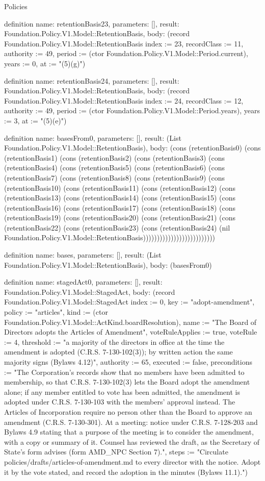 \begin{lexlean}{Policies}
\begin{semanticmodule}
definition{
  name: retentionBasis23,
  parameters: [],
  result: Foundation.Policy.V1.Model::RetentionBasis,
  body: (record Foundation.Policy.V1.Model::RetentionBasis {index := 23, recordClass := 11, authority := 49, period := (ctor Foundation.Policy.V1.Model::Period.current), years := 0, at := "(5)(g)"})
}

definition{
  name: retentionBasis24,
  parameters: [],
  result: Foundation.Policy.V1.Model::RetentionBasis,
  body: (record Foundation.Policy.V1.Model::RetentionBasis {index := 24, recordClass := 12, authority := 49, period := (ctor Foundation.Policy.V1.Model::Period.years), years := 3, at := "(5)(e)"})
}

definition{
  name: basesFrom0,
  parameters: [],
  result: (List Foundation.Policy.V1.Model::RetentionBasis),
  body: (cons (retentionBasis0) (cons (retentionBasis1) (cons (retentionBasis2) (cons (retentionBasis3) (cons (retentionBasis4) (cons (retentionBasis5) (cons (retentionBasis6) (cons (retentionBasis7) (cons (retentionBasis8) (cons (retentionBasis9) (cons (retentionBasis10) (cons (retentionBasis11) (cons (retentionBasis12) (cons (retentionBasis13) (cons (retentionBasis14) (cons (retentionBasis15) (cons (retentionBasis16) (cons (retentionBasis17) (cons (retentionBasis18) (cons (retentionBasis19) (cons (retentionBasis20) (cons (retentionBasis21) (cons (retentionBasis22) (cons (retentionBasis23) (cons (retentionBasis24) (nil Foundation.Policy.V1.Model::RetentionBasis))))))))))))))))))))))))))
}

definition{
  name: bases,
  parameters: [],
  result: (List Foundation.Policy.V1.Model::RetentionBasis),
  body: (basesFrom0)
}

definition{
  name: stagedAct0,
  parameters: [],
  result: Foundation.Policy.V1.Model::StagedAct,
  body: (record Foundation.Policy.V1.Model::StagedAct {index := 0, key := "adopt-amendment", policy := "articles", kind := (ctor Foundation.Policy.V1.Model::ActKind.boardResolution), name := "The Board of Directors adopts the Articles of Amendment", voteRuleApplies := true, voteRule := 4, threshold := "a majority of the directors in office at the time the amendment is adopted (C.R.S. 7-130-102(3)); by written action the same majority signs (Bylaws 4.12)", authority := 65, executed := false, preconditions := "The Corporation's records show that no members have been admitted to membership, so that C.R.S. 7-130-102(3) lets the Board adopt the amendment alone; if any member entitled to vote has been admitted, the amendment is adopted under C.R.S. 7-130-103 with the members' approval instead. The Articles of Incorporation require no person other than the Board to approve an amendment (C.R.S. 7-130-301). At a meeting: notice under C.R.S. 7-128-203 and Bylaws 4.9 stating that a purpose of the meeting is to consider the amendment, with a copy or summary of it. Counsel has reviewed the draft, as the Secretary of State's form advises (form AMD_NPC Section 7).", steps := "Circulate policies/drafts/articles-of-amendment.md to every director with the notice. Adopt it by the vote stated, and record the adoption in the minutes (Bylaws 11.1)."})
}


\end{semanticmodule}
\end{lexlean}
